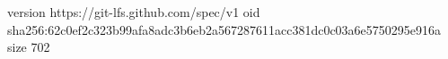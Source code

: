 version https://git-lfs.github.com/spec/v1
oid sha256:62c0ef2c323b99afa8adc3b6eb2a567287611acc381dc0c03a6e5750295e916a
size 702

